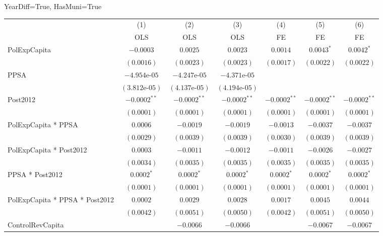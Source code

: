 \begin{table}[H]
    \centering
    \scriptsize
    \begin{minipage}{\textwidth}
    \centering
    {\normalsize YearDiff=True, HasMuni=True}
    \vspace{6pt}
    \begin{tabular}{lcccccc}
        \toprule
         & (1) & (2) & (3) & (4) & (5) & (6) \\
         & OLS & OLS & OLS & FE & FE & FE \\
        \midrule
        PolExpCapita & $-0.0003$ & $0.0025$ & $0.0023$ & $0.0014$ & $0.0043^{*}$ & $0.0042^{*}$ \\
         & $(0.0016)$ & $(0.0023)$ & $(0.0023)$ & $(0.0017)$ & $(0.0022)$ & $(0.0022)$ \\[4pt]
        PPSA & $-4.954\text{e-}05$ & $-4.247\text{e-}05$ & $-4.371\text{e-}05$ &  &  &  \\
         & $(3.812\text{e-}05)$ & $(4.137\text{e-}05)$ & $(4.194\text{e-}05)$ &  &  &  \\[4pt]
        Post2012 & $-0.0002^{**}$ & $-0.0002^{**}$ & $-0.0002^{**}$ & $-0.0002^{**}$ & $-0.0002^{**}$ & $-0.0002^{**}$ \\
         & $(0.0001)$ & $(0.0001)$ & $(0.0001)$ & $(0.0001)$ & $(0.0001)$ & $(0.0001)$ \\[4pt]
        PolExpCapita * PPSA & $0.0006$ & $-0.0019$ & $-0.0019$ & $-0.0013$ & $-0.0037$ & $-0.0037$ \\
         & $(0.0029)$ & $(0.0039)$ & $(0.0039)$ & $(0.0030)$ & $(0.0039)$ & $(0.0039)$ \\[4pt]
        PolExpCapita * Post2012 & $0.0003$ & $-0.0011$ & $-0.0012$ & $-0.0011$ & $-0.0026$ & $-0.0027$ \\
         & $(0.0034)$ & $(0.0035)$ & $(0.0035)$ & $(0.0035)$ & $(0.0035)$ & $(0.0035)$ \\[4pt]
        PPSA * Post2012 & $0.0002^{*}$ & $0.0002^{*}$ & $0.0002^{*}$ & $0.0002^{*}$ & $0.0002^{*}$ & $0.0002^{*}$ \\
         & $(0.0001)$ & $(0.0001)$ & $(0.0001)$ & $(0.0001)$ & $(0.0001)$ & $(0.0001)$ \\[4pt]
        PolExpCapita * PPSA * Post2012 & $0.0002$ & $0.0029$ & $0.0028$ & $0.0017$ & $0.0045$ & $0.0044$ \\
         & $(0.0042)$ & $(0.0051)$ & $(0.0050)$ & $(0.0042)$ & $(0.0051)$ & $(0.0050)$ \\[4pt]
        ControlRevCapita &  & $-0.0066$ & $-0.0066$ &  & $-0.0067$ & $-0.0067$ \\

\end{tabular}
\end{minipage}
\end{table}
